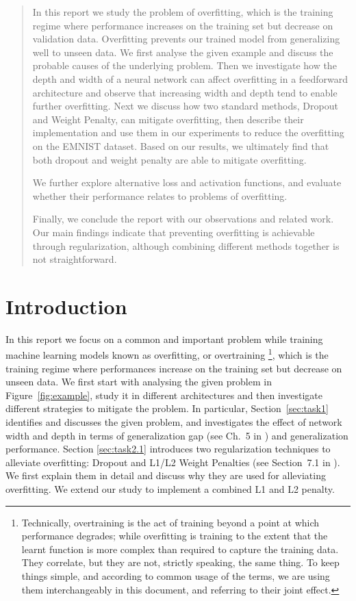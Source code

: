 \documentclass{article}
\begin{document}
 



\begin{abstract} 
In this report we study the problem of overfitting, which is the training regime where performance increases on the training set but decrease on validation data. Overfitting prevents our trained model from generalizing well to unseen data.
We first analyse the given example and discuss the probable causes of the underlying problem. 
Then we investigate how the depth and width of a neural network can affect overfitting in a feedforward architecture and observe that increasing width and depth tend to enable further overfitting.
Next we discuss how two standard methods, Dropout and Weight Penalty, can
mitigate overfitting, then describe their implementation and use them in our experiments
to reduce the overfitting on the EMNIST dataset. 
Based on our results, we ultimately find that both dropout and weight penalty are able to mitigate overfitting.

We further explore alternative loss and activation functions, and evaluate whether their performance relates to problems of overfitting.

Finally, we conclude the report with our observations and related work. 
Our main findings indicate that preventing overfitting is achievable through regularization, although combining different methods together is not straightforward.
\end{abstract} 


\section{Introduction}
\label{sec:intro}
In this report we focus on a common and important problem while training machine learning models known as overfitting, or overtraining \footnote{Technically, overtraining is the act of training beyond a point at which performance degrades; while overfitting is training to the extent that the learnt function is more complex than required to capture the training data. They correlate, but they are not, strictly speaking, the same thing. To keep things simple, and according to common usage of the terms, we are using them interchangeably in this document, and referring to their joint effect.}, which is the training regime where performances increase on the training set but decrease on unseen data.
We first start with analysing the given problem in Figure~\ref{fig:example}, study it in different architectures and then investigate different strategies to mitigate the problem.
In particular, Section~\ref{sec:task1} identifies and discusses the given problem, and investigates the effect of network width and depth in terms of generalization gap (see Ch.~5 in \citealt{Goodfellow-et-al-2016}) and generalization performance.
Section \ref{sec:task2.1} introduces two regularization techniques to alleviate overfitting: Dropout \cite{srivastava2014dropout} and L1/L2 Weight Penalties (see Section~7.1 in \citealt{Goodfellow-et-al-2016}). 
We first explain them in detail and discuss why they are used for alleviating overfitting.
We extend our study to implement a combined L1 and L2 penalty.
\end{document}
